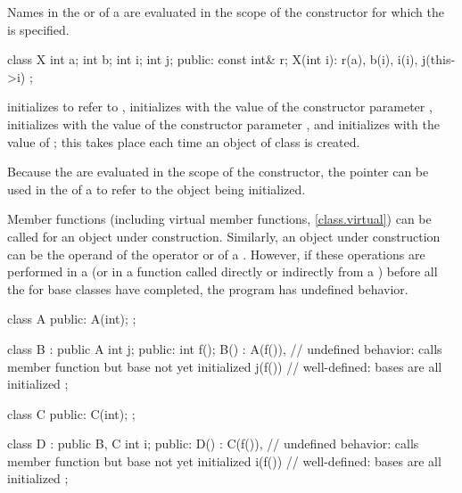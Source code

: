 \pnum
{}%
Names in the
or 
of a
are evaluated in the scope of the constructor for which the
is specified.
\begin{example}
\begin{codeblock}
class X {
  int a;
  int b;
  int i;
  int j;
public:
  const int& r;
  X(int i): r(a), b(i), i(i), j(this->i) { }
};
\end{codeblock}

initializes
to refer to
,
initializes
with the value of the constructor parameter
,
initializes
with the value of the constructor parameter
,
and initializes
with the value of
;
this takes place each time an object of class
is created.
\end{example}
\begin{note}
Because the
are evaluated in the scope of the constructor, the
pointer can be used in the
of a
to refer to the object being initialized.
\end{note}

\pnum
{}%
Member functions (including virtual member functions, \ref{class.virtual}) can be
called for an object under construction.
Similarly, an object under construction can be the operand of the
operator or of a
.
However, if these operations are performed in a
(or in a function called directly or indirectly from a
)
before all the
for base classes have completed, the program has undefined behavior.
\begin{example}
\begin{codeblock}
class A {
public:
  A(int);
};

class B : public A {
  int j;
public:
  int f();
  B() : A(f()),     // undefined behavior: calls member function but base  not yet initialized
  j(f()) { }        // well-defined: bases are all initialized
};

class C {
public:
  C(int);
};

class D : public B, C {
  int i;
public:
  D() : C(f()),     // undefined behavior: calls member function but base  not yet initialized
  i(f()) { }        // well-defined: bases are all initialized
};
\end{codeblock}
\end{example}

